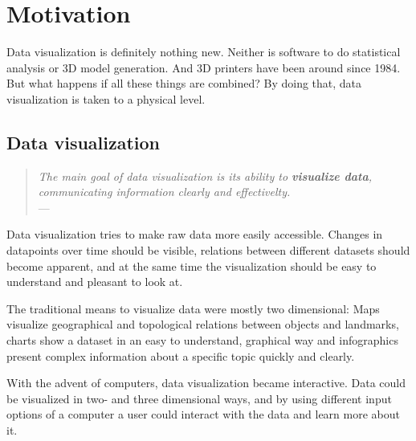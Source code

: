 
\chapter{Motivation}

\label{ch:motivation} %


Data visualization is definitely nothing new. Neither is software to do
statistical analysis or 3D model generation. And 3D printers have been around
since 1984. But what happens if all these things are combined? By doing that,
data visualization is taken to a physical level.


\section{Data visualization}\label{sec:datavis}

\begin{quote}{\slshape
The main goal of data visualization is its ability to \textbf{visualize data},
communicating information clearly and effectivelty.} \\ \medskip
---  \citep{friedman:2008}
\end{quote}

Data visualization tries to make raw data more easily accessible. Changes in
datapoints over time should be visible, relations between different datasets
should become apparent, and at the same time the visualization should be easy to
understand and pleasant to look at.

The traditional means to visualize data were mostly two dimensional: Maps
visualize geographical and topological relations between objects and landmarks,
charts show a dataset in an easy to understand, graphical way and infographics
present complex information about a specific topic quickly and clearly.

With the advent of computers, data visualization became interactive. Data could
be visualized in two- and three dimensional ways, and by using different input
options of a computer a user could interact with the data and learn more about
it.

